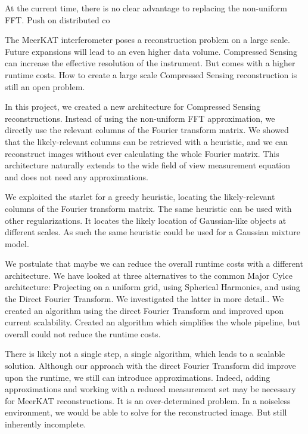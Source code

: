 At the current time, there is no clear advantage to replacing the non-uniform FFT.
Push on distributed co












The MeerKAT interferometer poses a reconstruction problem on a large scale. Future expansions will lead to an even higher data volume. Compressed Sensing can increase the effective resolution of the instrument. But comes with a higher runtime costs. How to create a large scale Compressed Sensing reconstruction is still an open problem.



In this project, we created a new architecture for Compressed Sensing reconstructions. Instead of using the non-uniform FFT approximation, we directly use the relevant columns of the Fourier transform matrix. We showed that the likely-relevant columns can be retrieved with a heuristic, and we can reconstruct images without ever calculating the whole Fourier matrix. This architecture naturally extends to the wide field of view measurement equation and does not need any approximations. 

We exploited the starlet for a greedy heuristic, locating the likely-relevant columns of the Fourier transform matrix. The same heuristic can be used with other regularizations. It locates the likely location of Gaussian-like objects at different scales. As such the same heuristic could be used for a Gaussian mixture model. 



We postulate that maybe we can reduce the overall runtime costs with a different architecture. We have looked at three alternatives to the common Major Cylce architecture: Projecting on a uniform grid, using Spherical Harmonics, and using the Direct Fourier Transform. We investigated the latter in more detail.. We created an algorithm using the direct Fourier Transform and improved upon current scalability. Created an algorithm which simplifies the whole pipeline, but overall could not reduce the runtime costs.





There is likely not a single step, a single algorithm, which leads to a scalable solution. Although our approach with the direct Fourier Transform did improve upon the runtime, we still can introduce approximations. Indeed, adding approximations and working with a reduced measurement set may be necessary for MeerKAT reconstructions. It is an over-determined problem. In a noiseless environment, we would be able to solve for the reconstructed image. But still inherently incomplete.



